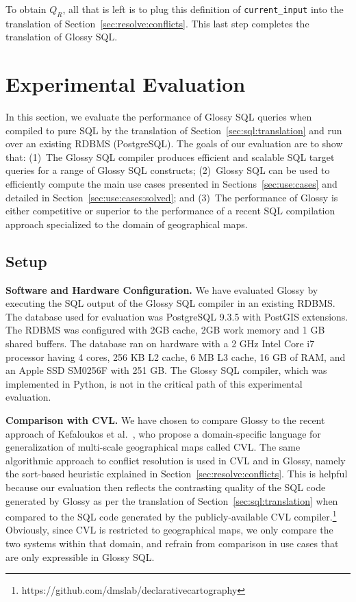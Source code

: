 \documentclass[11pt, oneside]{report}
\newcommand{\minisec}[1]{\noindent\textbf{#1.}}
\begin{document}
To obtain $Q_R$, all that is left is to plug  this definition of \texttt{current\_input} into the translation of Section~\ref{sec:resolve:conflicts}. This last step completes the translation of Glossy SQL.

\section{Experimental Evaluation}
\label{sec:experimental:evaluation}

In this section, we evaluate the performance of Glossy SQL queries when compiled to pure SQL by the  translation of Section~\ref{sec:sql:translation} and run over an existing RDBMS (PostgreSQL). The goals of our evaluation are to show that: 
(1)~The Glossy SQL compiler produces efficient and scalable SQL target queries for a range of Glossy SQL constructs; (2)~Glossy SQL can be used to efficiently compute the main use cases presented in Sections~\ref{sec:use:cases} and detailed in Section~\ref{sec:use:cases:solved}; and (3)~The performance of Glossy is either competitive or superior to the performance of a recent SQL compilation approach specialized to the domain of geographical maps. 


\subsection{Setup}
\minisec{Software and Hardware Configuration}
We have evaluated Glossy by executing the SQL output of the Glossy SQL compiler in an existing RDBMS. The database used for evaluation was PostgreSQL 9.3.5 with PostGIS extensions. The RDBMS was configured with 2GB cache, 2GB work memory and 1 GB shared buffers. The database ran on hardware with a 2 GHz Intel Core i7 processor having 4 cores, 256 KB L2 cache, 6 MB L3 cache, 16 GB of RAM, and an Apple SSD SM0256F with 251 GB. The Glossy SQL compiler, which was implemented in Python, is not in the critical path of this experimental evaluation.

\minisec{Comparison with CVL}
We have chosen to compare Glossy to the recent approach of Kefaloukos et al.~\cite{KefaloukosSZ14:CVL}, who propose a domain-specific language for generalization of multi-scale geographical maps called CVL. The same algorithmic approach to conflict resolution is used in CVL and in Glossy, namely the sort-based heuristic explained in Section~\ref{sec:resolve:conflicts}. This is helpful because our evaluation then reflects the contrasting quality of the SQL code generated by Glossy as per the translation of Section~\ref{sec:sql:translation} when compared to the SQL code generated by the publicly-available CVL compiler.\footnote{https://github.com/dmslab/declarativecartography} Obviously, since CVL is restricted to geographical maps, we only compare the two systems within that domain, and refrain from comparison in use cases that are only expressible in Glossy SQL.  
\end{document}
